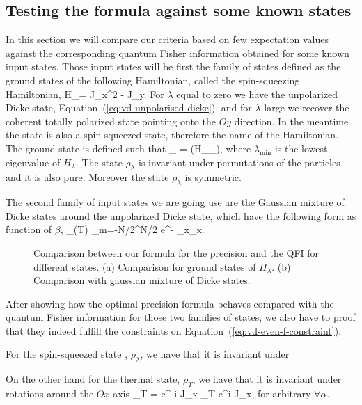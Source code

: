 {\subsection{Testing the formula against some known states}

In this section we will compare our criteria based on few expectation values against the corresponding quantum Fisher information obtained for some known input states.
Those input states will be first the family of states defined as the ground states of the following Hamiltonian, called the spin-squeezing Hamiltonian,
\be
  H_\lambda = J_x^2 - \lambda J_y.
\ee
For $\lambda$ equal to zero we have the unpolarized Dicke state, Equation~{(\ref{eq:vd-unpolarised-dicke})}, and for $\lambda$ large we recover the coherent totally polarized state pointing onto the $Oy$ direction.
In the meantime the state is also a spin-squeezed state, therefore the name of the Hamiltonian.
The ground state is defined such that
\be
  \lambda_{\min} = \tr(H_\lambda \rho_\lambda),
\ee
where $\lambda_{\min}$ is the lowest eigenvalue of $H_\lambda$.
The state $\rho_\lambda$ is invariant under permutations of the particles and it is also pure.
Moreover the state $\rho_\lambda$ is symmetric.

The second family of input states we are going use are the Gaussian mixture of Dicke states around the unpolarized Dicke state, which have the following form as function of $\beta$,
\be
  \rho_{(T)} \propto \sum_{m=-N/2}^{N/2} e^{- } _x_x.
\ee

\begin{figure}
  \centering
  \caption{Comparison between our formula for the precision and the QFI for different states. (a) Comparison for ground states of $H_\lambda$. (b) Comparison with gaussian mixture of Dicke states.}
  \label{fig:bg-histograms}
\end{figure}

After showing how the optimal precision formula behaves compared with the quantum Fisher information for those two families of states, we also have to proof that they indeed fulfill the constraints on Equation~{(\ref{eq:vd-even-f-constraint})}.

For the spin-squeezed state , $\rho_\lambda$, we have that it is invariant under

On the other hand for the thermal state, $\rho_T$, we have that it is invariant under rotations around the $Ox$ axis
\be
  \rho_T = e^{-i \alpha J_x} \rho_T e^{i \alpha J_x},
\ee
for arbitrary $\forall \alpha$.

}
